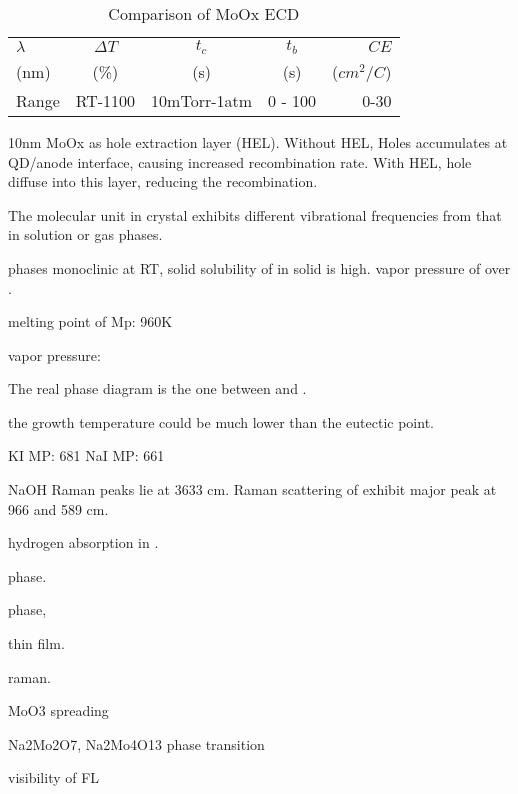 \begin{table}[htb]
\centering
\caption{Comparison of MoOx ECD}\label{tab:moxecd}
\begin{tabular}{lcccr}
\toprule
$\lambda$ & $\Delta T$ & $t_c$ & $t_b$ & $CE$  \\
         (nm) & (\%)    & (s) & (s) & ($cm^2/C$)  \\
\midrule
Range      & RT-1100    & 10mTorr-1atm & 0 - 100 & 0-30  \\
\bottomrule
\end{tabular}
\end{table}



10nm MoOx as hole extraction layer (HEL). Without HEL, Holes accumulates at QD/anode interface, causing increased recombination rate. With HEL, hole diffuse into this layer, reducing the recombination.

The molecular unit in crystal exhibits different vibrational frequencies from that in solution or gas phases.

 phases monoclinic at RT, solid solubility of  in solid  is high. vapor pressure of  over .

melting point of 
Mp:  960K

 vapor pressure:

The real phase diagram is the one between  and .

the growth temperature could be much lower than the eutectic point.

KI MP:  681
NaI MP: 661

NaOH Raman peaks lie at 3633 cm. \cite{walrafen2006} Raman scattering of  exhibit major peak at 966 and 589 cm.\cite{Richet1996}

hydrogen absorption in .\cite{Sha2009}

 phase. \cite{Bramnik2004}

 phase, \cite{Gatehouse1983}

 thin film. \cite{Carcia1987}

 raman.\cite{Hirata1996}

MoO3 spreading \cite{Leyrer1990}

Na2Mo2O7, Na2Mo4O13 phase transition \cite{SinghMudher2005}\cite{Tangri1992}

visibility of FL \cite{Benameur2011}

